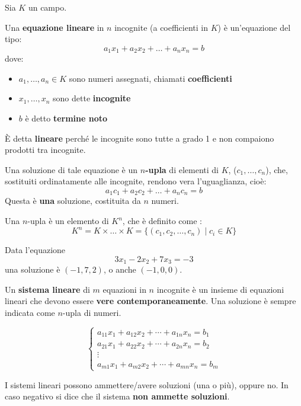 \documentclass[
  a4paper,
]{article}
\providecommand{\tightlist}{%
  \setlength{\itemsep}{0pt}\setlength{\parskip}{0pt}}
\providecommand{\tightlist}{}
\begin{document}
Sia \(K\) un campo.

\begin{definitionbox}
Una \textbf{equazione lineare} in \(n\) incognite (a coefficienti in
\(K\)) è un'equazione del tipo: \[
a_1x_1 + a_2 x_2 + \dots + a_n x_n = b
\] dove:

\begin{itemize}
\tightlist
\item
  \(a_1, \dots, a_n \in K\) sono numeri assegnati, chiamati
  \textbf{coefficienti}
\item
  \(x_1, \dots, x_n\) sono dette \textbf{incognite}
\item
  \(b\) è detto \textbf{termine noto}
\end{itemize}

È detta \textbf{lineare} perché le incognite sono tutte a grado 1 e non
compaiono prodotti tra incognite.
\end{definitionbox}

\begin{definitionbox}
Una soluzione di tale equazione è un \textbf{\(n\)-upla} di elementi di
\(K\), (\(c_1, \dots, c_n\)), che, sostituiti ordinatamente alle
incognite, rendono vera l'uguaglianza, cioè: \[
a_1 c_1 + a_2 c_2 + \dots + a_n c_n = b
\] Questa è \textbf{una} soluzione, costituita da \(n\) numeri.
\end{definitionbox}

\begin{notebox}
Una \(n\)-upla è un elemento di \(K^n\), che è definito come : \[
K^n = K \times \dots \times K = \{(c_1, c_2, \dots, c_n) \; | \; c_i \in K\}
\]
\end{notebox}

\begin{examplebox}
Data l'equazione \[
3x_1 -2x_2 + 7x_3 = -3
\] una soluzione è \((-1, 7, 2)\), o anche \((-1, 0, 0)\).
\end{examplebox}

\begin{definitionbox}
Un \textbf{sistema lineare} di \(m\) equazioni in \(n\) incognite è un
insieme di equazioni lineari che devono essere \textbf{vere
contemporaneamente}. Una soluzione è sempre indicata come \(n\)-upla di
numeri.

\[
\begin{cases}
a_{11}x_1 + a_{12}x_2 + \cdots + a_{1n}x_n = b_1\\
a_{21}x_1 + a_{22}x_2 + \cdots + a_{2n}x_n = b_2\\
\vdots\\
a_{m1}x_1 + a_{m2}x_2 + \cdots + a_{mn}x_n = b_m
\end{cases}
\]

I sistemi lineari possono ammettere/avere soluzioni (una o più), oppure
no. In caso negativo si dice che il sistema \textbf{non ammette
soluzioni}.
\end{definitionbox}
\end{document}
